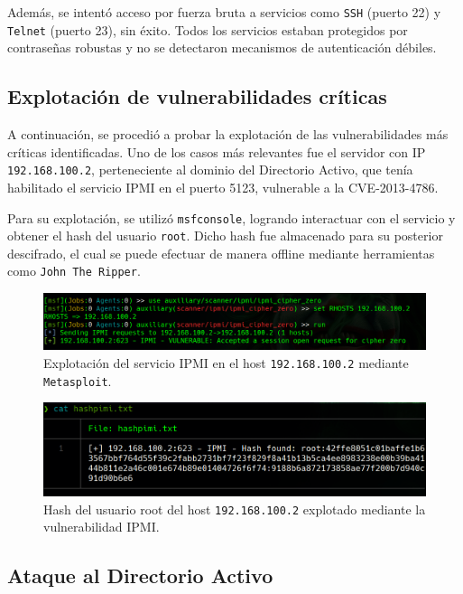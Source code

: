 \documentclass[a4paper, 11pt]{article}
\begin{document}
Además, se intentó acceso por fuerza bruta a servicios como \texttt{SSH} (puerto 22) y \texttt{Telnet} (puerto 23), sin éxito. Todos los servicios estaban protegidos por contraseñas robustas y no se detectaron mecanismos de autenticación débiles.

\subsection*{Explotación de vulnerabilidades críticas}

A continuación, se procedió a probar la explotación de las vulnerabilidades más críticas identificadas. Uno de los casos más relevantes fue el servidor con IP \texttt{192.168.100.2}, perteneciente al dominio del Directorio Activo, que tenía habilitado el servicio IPMI en el puerto 5123, vulnerable a la CVE-2013-4786.

Para su explotación, se utilizó \texttt{msfconsole}, logrando interactuar con el servicio y obtener el hash del usuario \texttt{root}. Dicho hash fue almacenado para su posterior descifrado, el cual se puede efectuar de manera offline mediante herramientas como \texttt{John The Ripper}.

\begin{figure}[H]
    \centering
    \includegraphics[width=1.1\textwidth]{images/ipmi_prueba.png}
    \caption{Explotación del servicio IPMI en el host \texttt{192.168.100.2} mediante \texttt{Metasploit}.}
    \label{fig:ipmi_prueba}
\end{figure}

\begin{figure}[H]
    \centering
    \includegraphics[width=1.1\textwidth]{images/hash_ipmi.png}
    \caption{Hash del usuario root del host \texttt{192.168.100.2} explotado mediante la vulnerabilidad IPMI.}
    \label{fig:hash_ipmi}
\end{figure}

\subsection*{Ataque al Directorio Activo}
\end{document}
